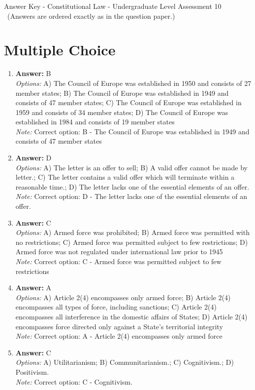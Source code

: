 \documentclass[12pt]{article}
\begin{document}
\begin{center}
Answer Key - Constitutional Law - Undergraduate Level Assessment 10 \
\small (Answers are ordered exactly as in the question paper.)
\end{center}

\section*{Multiple Choice}
\begin{enumerate}[label=\arabic*.]
\item \textbf{Answer:} B
\\ \textit{Options:} A) The Council of Europe was established in 1950 and consists of 27 member states; B) The Council of Europe was established in 1949 and consists of 47 member states; C) The Council of Europe was established in 1959 and consists of 34 member states; D) The Council of Europe was established in 1984 and consists of 19 member states
\\ \textit{Note:} Correct option: B - The Council of Europe was established in 1949 and consists of 47 member states
\item \textbf{Answer:} D
\\ \textit{Options:} A) The letter is an offer to sell; B) A valid offer cannot be made by letter.; C) The letter contains a valid offer which will terminate within a reasonable time.; D) The letter lacks one of the essential elements of an offer.
\\ \textit{Note:} Correct option: D - The letter lacks one of the essential elements of an offer.
\item \textbf{Answer:} C
\\ \textit{Options:} A) Armed force was prohibited; B) Armed force was permitted with no restrictions; C) Armed force was permitted subject to few restrictions; D) Armed force was not regulated under international law prior to 1945
\\ \textit{Note:} Correct option: C - Armed force was permitted subject to few restrictions
\item \textbf{Answer:} A
\\ \textit{Options:} A) Article 2(4) encompasses only armed force; B) Article 2(4) encompasses all types of force, including sanctions; C) Article 2(4) encompasses all interference in the domestic affairs of States; D) Article 2(4) encompasses force directed only against a State's territorial integrity
\\ \textit{Note:} Correct option: A - Article 2(4) encompasses only armed force
\item \textbf{Answer:} C
\\ \textit{Options:} A) Utilitarianism; B) Communitarianism.; C) Cognitivism.; D) Positivism.
\\ \textit{Note:} Correct option: C - Cognitivism.
\end{enumerate}
\end{document}
